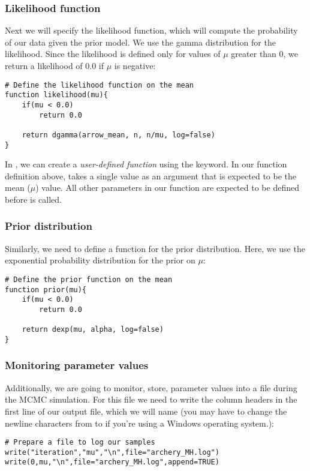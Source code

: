 \subsubsection{Likelihood function}
Next we will specify the likelihood function, which will compute the probability of our data given the prior model.
We use the gamma distribution for the likelihood. Since the likelihood is defined only for values of $\mu$ greater than 0, we return a likelihood of 0.0 if $\mu$ is negative:
{\tt \begin{snugshade*}
\begin{lstlisting}
# Define the likelihood function on the mean 
function likelihood(mu){
    if(mu < 0.0)
        return 0.0

    return dgamma(arrow_mean, n, n/mu, log=false)
}
\end{lstlisting}
\end{snugshade*}}

In \Rev, we can create a {\em user-defined function} using the  keyword. In our function definition above,  takes a single value as an argument that is expected to be the mean ($\mu$) value.
All other parameters in our function are expected to be defined before  is called.


\subsubsection{Prior distribution}
Similarly, we need to define a function for the prior distribution.
Here, we use the exponential probability distribution for the prior on $\mu$:
{\tt \begin{snugshade*}
\begin{lstlisting}    
# Define the prior function on the mean 
function prior(mu){
    if(mu < 0.0)
        return 0.0

    return dexp(mu, alpha, log=false)
}
\end{lstlisting}
\end{snugshade*}}



\subsubsection{Monitoring parameter values}
Additionally, we are going to monitor, \IE store, parameter values into a file during the MCMC simulation.
For this file we need to write the column headers in the first line of our output file, which we will name  (you may have to change the newline characters from  to  if you're using a Windows operating system.):
{\tt \begin{snugshade*}
\begin{lstlisting}
# Prepare a file to log our samples
write("iteration","mu","\n",file="archery_MH.log")
write(0,mu,"\n",file="archery_MH.log",append=TRUE)
\end{lstlisting}
\end{snugshade*}}

